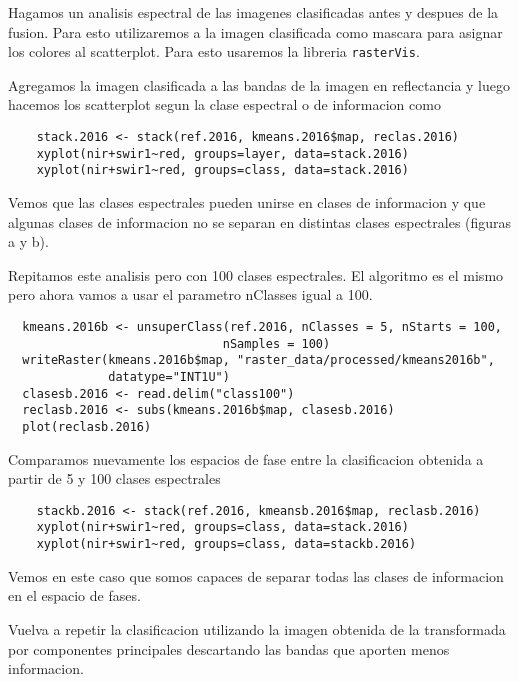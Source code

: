 \begin{exa}
  Hagamos un analisis espectral de las imagenes clasificadas antes y despues de la fusion.
  Para esto utilizaremos a la imagen clasificada como mascara para asignar los colores
  al scatterplot. Para esto usaremos la libreria \texttt{rasterVis}.

  Agregamos la imagen clasificada a las bandas de la imagen en reflectancia y luego
  hacemos los scatterplot segun la clase espectral o de informacion como

  \begin{lstlisting}
    stack.2016 <- stack(ref.2016, kmeans.2016$map, reclas.2016)
    xyplot(nir+swir1~red, groups=layer, data=stack.2016)
    xyplot(nir+swir1~red, groups=class, data=stack.2016)
  \end{lstlisting}

  Vemos que las clases espectrales pueden unirse en clases de informacion y que algunas
  clases de informacion no se separan en distintas clases espectrales (figuras a y b).

\end{exa}

\begin{exa}
  Repitamos este analisis pero con 100 clases espectrales. El algoritmo es el mismo
  pero ahora vamos a usar el parametro nClasses igual a 100.
  \begin{lstlisting}
  kmeans.2016b <- unsuperClass(ref.2016, nClasses = 5, nStarts = 100,
                              nSamples = 100)
  writeRaster(kmeans.2016b$map, "raster_data/processed/kmeans2016b",
              datatype="INT1U")
  clasesb.2016 <- read.delim("class100")
  reclasb.2016 <- subs(kmeans.2016b$map, clasesb.2016)
  plot(reclasb.2016)
  \end{lstlisting}
  Comparamos nuevamente los espacios de fase entre la clasificacion obtenida
  a partir de 5 y 100 clases espectrales
  \begin{lstlisting}
    stackb.2016 <- stack(ref.2016, kmeansb.2016$map, reclasb.2016)
    xyplot(nir+swir1~red, groups=class, data=stack.2016)
    xyplot(nir+swir1~red, groups=class, data=stackb.2016)
  \end{lstlisting}

  Vemos en este caso que somos capaces de separar todas las clases de informacion
  en el espacio de fases.

\end{exa}

\begin{act}
    Vuelva a repetir la clasificacion utilizando la imagen obtenida de la
    transformada por componentes principales descartando las bandas que aporten
    menos informacion.
\end{act}


